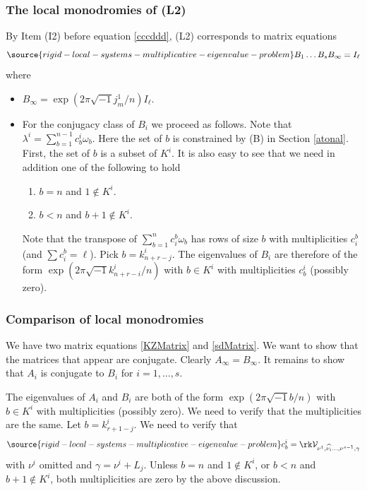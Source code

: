 \subsubsection{The local monodromies of (L2)}
By Item (I2) before equation \eqref{cccddd}, (L2) corresponds to matrix equations
\begin{equation}\label{sdMatrix}
\source{rigid-local-systems-multiplicative-eigenvalue-problem}
B_1\dots B_s B_{\infty}=I_{\ell}
\end{equation}
 where
\begin{itemize}
\item  $B_{\infty}=\exp(2\pi\sqrt{-1}j^1_m/n)I_{\ell}$.
\item For the conjugacy class of $B_i$ we proceed as follows. Note that $\lambda^i=\sum_{b=1}^{n-1} c^i_b\omega_b$. Here the set of $b$ is constrained  by (B) in Section \ref{atonal}. First, the set of $b$ is a subset of $K^i$. It is also easy to see that we need in addition one of the following to hold
\begin{enumerate}
\item  $b=n$ and $1\not\in K^i$.
\item $b<n$ and $b+1\not\in K^i$.
\end{enumerate}
Note that the transpose of $\sum_{b=1}^n c^b_i\omega_b$ has rows of size $b$ with multiplicities $c^b_i$ (and $\sum c^b_i=\ell$).  Pick $b=k^i_{n+r-j}$. The eigenvalues of $B_i$ are therefore of the form $\exp(2\pi\sqrt{-1}k^i_{n+r-i}/n)$ with $b\in K^i$ with multiplicities $c^i_b$ (possibly zero).
\end{itemize}
\subsubsection{Comparison of local monodromies}
We have two matrix equations \eqref{KZMatrix} and \eqref{sdMatrix}. We want to show that the matrices that appear are conjugate.
Clearly $A_{\infty}=B_{\infty}$. It remains to show that $A_i$ is conjugate to $B_i$ for $i=1,\dots,s$.

The eigenvalues of $A_i$ and $B_i$ are both of the form $\exp(2\pi\sqrt{-1}b/n)$ with $b\in K^i$ with multiplicities (possibly zero). We need to verify that the multiplicities are the same.
Let $b=k^i_{r+1-j}$. We need to verify that
\begin{equation}\label{desiree}
\source{rigid-local-systems-multiplicative-eigenvalue-problem}
c^i_b=\rk \mathcal{V}_{\nu^1,\widehat{\nu_i}\dots,\nu^{s-1},\gamma}
\end{equation}
with $\nu^i$ omitted and $\gamma=\nu^i+L_j$. Unless $b=n$ and $1\not\in K^i$, or $b<n$ and $b+1\not\in K^i$, both multiplicities are zero by the above discussion.

